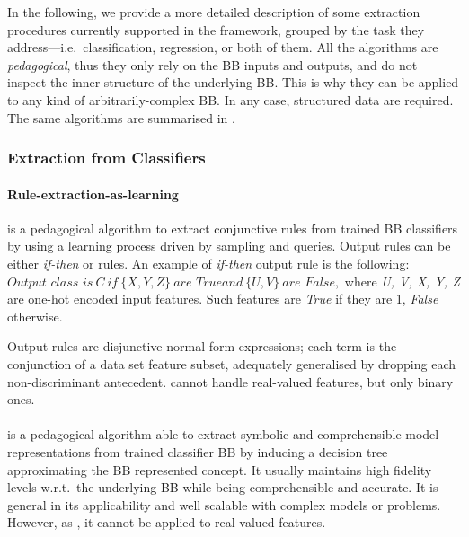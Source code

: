 \documentclass[12pt,a4paper,openright,twoside]{book}
\begin{document}
In the following, we provide a more detailed description of some extraction procedures currently supported in the \psyke{} framework, grouped by the task they address---i.e.\ classification, regression, or both of them.
%
All the algorithms are \emph{pedagogical}, thus they only rely on the BB inputs and outputs, and do not inspect the inner structure of the underlying BB.
%
This is why they can be applied to any kind of arbitrarily-complex BB.
%
In any case, structured data are required.
%
The same algorithms are summarised in .



\subsubsection{Extraction from Classifiers}\label{ssec:classifiers}

\paragraph{Rule-extraction-as-learning}\label{par:real}

\real{} \cite{CravenS94} is a pedagogical algorithm to extract conjunctive rules from trained BB classifiers by using a learning process driven by sampling and queries.
%
Output rules can be either \emph{if-then} or \mofn{} rules.
%
An example of \emph{if-then} output rule is the following: $\textit{Output class is} ~ C ~ \textit{if} ~ \{ \mathit{X}, \mathit{Y}, \mathit{Z} \} \allowbreak ~ \textit{are True} \allowbreak \textit{and} ~  \{ \mathit{U}, \mathit{V} \} ~ \textit{are False},$
%
\noindent where \textit{U, V, X, Y, Z} are one-hot encoded input features.
%
Such features are \textit{True} if they are 1, \textit{False} otherwise.

Output rules are disjunctive normal form expressions; each term is the conjunction of a data set feature subset, adequately generalised by dropping each non-discriminant antecedent.
%
\real{} cannot handle real-valued features, but only binary ones.

\paragraph{\trepan}\label{par:trepan}

\trepan{} \cite{Craven1996} is a pedagogical algorithm able to extract symbolic and comprehensible model representations from trained classifier BB by inducing a decision tree approximating the BB represented concept.
%
It usually maintains high fidelity levels w.r.t.\ the underlying BB while being comprehensible and accurate.
%
It is general in its applicability and well scalable with complex models or problems.
%
However, as \real{}, it cannot be applied to real-valued features.
\end{document}
